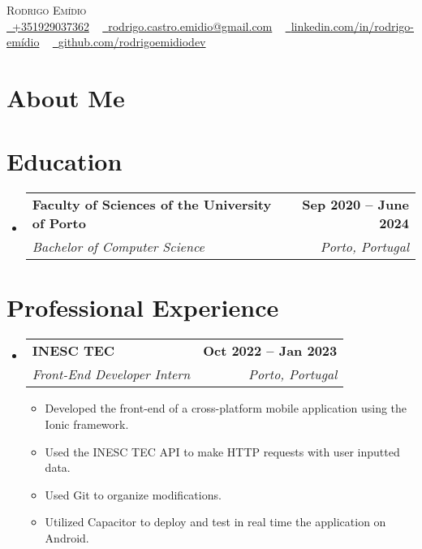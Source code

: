 \documentclass[letterpaper,11pt]{article}
\makeatletter
\newcommand{\resumeItem}[1]{
  \item\small{
    {#1 \vspace{-2pt}}
  }
}
\newcommand{\resumeSubheading}[4]{
  \vspace{-2pt}\item
    \begin{tabular*}{1.0\textwidth}[t]{l@{\extracolsep{\fill}}r}
      \textbf{#1} & \textbf{\small #2} \\
      \textit{\small#3} & \textit{\small #4} \\
    \end{tabular*}\vspace{-7pt}
}
\newcommand{\resumeSubHeadingListStart}{\begin{itemize}[leftmargin=0.0in, label={}]}
\newcommand{\resumeSubHeadingListEnd}{\end{itemize}}
\newcommand{\resumeItemListStart}{\begin{itemize}}
\newcommand{\resumeItemListEnd}{\end{itemize}\vspace{-5pt}}
\makeatother
\begin{document}

\begin{center}
    {\Huge \scshape Rodrigo Emídio} \\ \vspace{5pt}
    \small \href{tel:+351929037362}{\raisebox{-0.1\height}\faPhone\ {+351929037362}} ~ \href{mailto:rodrigo.castro.emidio@gmail.com}{\raisebox{-0.2\height}\faEnvelope\ {rodrigo.castro.emidio@gmail.com}} ~ 
    \href{https://www.linkedin.com/in/rodrigo-emídio/}{\raisebox{-0.2\height}\faLinkedin\ {linkedin.com/in/rodrigo-emídio}}  ~
    \href{https://github.com/rodrigoemidiodev}{\raisebox{-0.2\height}\faGithub\ {github.com/rodrigoemidiodev}}
    \vspace{-8pt}
\end{center}

\section{About Me}

\section{Education}
  \resumeSubHeadingListStart
    \resumeSubheading
      {Faculty of Sciences of the University of Porto}{Sep 2020 -- June 2024}
      {Bachelor of Computer Science}{Porto, Portugal}
  \resumeSubHeadingListEnd

\section{Professional Experience}
  \resumeSubHeadingListStart
    \resumeSubheading
      {INESC TEC}{Oct 2022 -- Jan 2023}
      {Front-End Developer Intern}{Porto, Portugal}
      \resumeItemListStart
        \resumeItem{Developed the front-end of a cross-platform mobile application using the Ionic framework.}
        \resumeItem{Used the INESC TEC API to make HTTP requests with user inputted data.}
        \resumeItem{Used Git to organize modifications.}
        \resumeItem{Utilized Capacitor to deploy and test in real time the application on Android.}
    \resumeItemListEnd
    \resumeSubHeadingListEnd
\vspace{-16pt}
\end{document}
